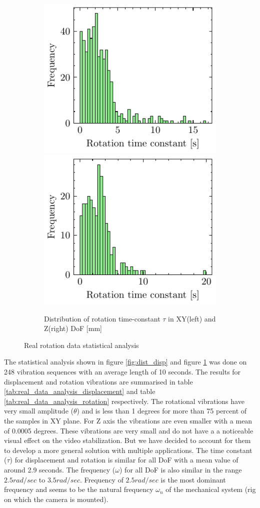 \begin{figure}
    \begin{subfigure}{\linewidth}
    \includegraphics[width=.5\linewidth]{images/fig_chapter4/data_dist/11.pdf}\hfill
    \includegraphics[width=.5\linewidth]{images/fig_chapter4/data_dist/12.pdf}
    \caption{Distribution of rotation time-constant $ \tau $ in XY(left) and Z(right) DoF [mm]}
    \end{subfigure}

\caption{Real rotation data statistical analysis}
\label{fig:dist_rot}
\end{figure}


The statistical analysis shown in figure \ref{fig:dist_disp} and figure \ref{fig:dist_rot} was done on 248 vibration sequences with an average length of 10 seconds. The results for displacement and rotation vibrations are summarised in table \ref{tab:real_data_analysis_displacement} and table \ref{tab:real_data_analysis_rotation} respectively. The rotational vibrations have very small amplitude ($ \theta $) and is less than 1 degrees for more than 75 percent of the samples in XY plane. For Z axis the vibrations are even smaller with a mean of 0.0005 degrees. These vibrations are very small and do not have a a noticeable visual effect on the video stabilization. But we have decided to account for them to develop a more general solution with multiple applications. The time constant ($ \tau $) for displacement and rotation is similar for all DoF with a mean value of around 2.9 seconds.  The frequency ($ \omega $) for all DoF is also similar in the range $ 2.5 rad/sec $ to $ 3.5 rad/sec $. Frequency of $ 2.5 rad/sec $ is the most dominant frequency and seems to be the natural frequency $ \omega_n $ of the mechanical system (rig on which the camera is mounted).


